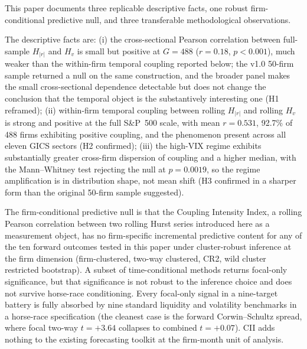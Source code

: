 \documentclass[preprint,12pt,authoryear]{elsarticle}
\begin{document}
This paper documents three replicable descriptive facts, one robust firm-conditional predictive null, and three transferable methodological observations.

The descriptive facts are: (i) the cross-sectional Pearson correlation between full-sample $H_{|r|}$ and $H_v$ is small but positive at $G = 488$ ($r = 0.18$, $p < 0.001$), much weaker than the within-firm temporal coupling reported below; the v1.0 50-firm sample returned a null on the same construction, and the broader panel makes the small cross-sectional dependence detectable but does not change the conclusion that the temporal object is the substantively interesting one (H1 reframed); (ii) within-firm temporal coupling between rolling $H_{|r|}$ and rolling $H_v$ is strong and positive at the full S\&P~500 scale, with mean $r = 0.531$, 92.7\% of 488 firms exhibiting positive coupling, and the phenomenon present across all eleven GICS sectors (H2 confirmed); (iii) the high-VIX regime exhibits substantially greater cross-firm dispersion of coupling and a higher median, with the Mann--Whitney test rejecting the null at $p = 0.0019$, so the regime amplification is in distribution shape, not mean shift (H3 confirmed in a sharper form than the original 50-firm sample suggested).

The firm-conditional predictive null is that the Coupling Intensity Index, a rolling Pearson correlation between two rolling Hurst series introduced here as a measurement object, has no firm-specific incremental predictive content for any of the ten forward outcomes tested in this paper under cluster-robust inference at the firm dimension (firm-clustered, two-way clustered, CR2, wild cluster restricted bootstrap). A subset of time-conditional methods returns focal-only significance, but that significance is not robust to the inference choice and does not survive horse-race conditioning. Every focal-only signal in a nine-target battery is fully absorbed by nine standard liquidity and volatility benchmarks in a horse-race specification (the cleanest case is the forward Corwin--Schultz spread, where focal two-way $t = +3.64$ collapses to combined $t = +0.07$). CII adds nothing to the existing forecasting toolkit at the firm-month unit of analysis.
\end{document}
